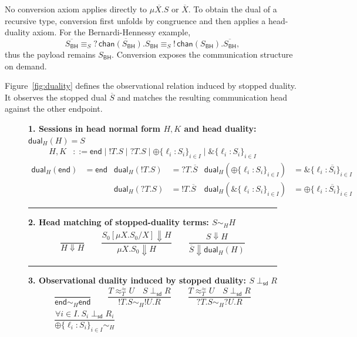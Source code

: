 \documentclass[submission,copyright,creativecommons]{eptcs}
\newcommand{\End}{\mathsf{end}}
\newcommand{\SBH}{S_{\mathsf{BH}}}
\newcommand{\SuspDual}[1]{\overline{#1}}
\newcommand{\EqT}[1]{\mathrel{\approx_T^{#1}}}
\newcommand{\ConvS}{\mathrel{\equiv_S}}
\newcommand{\MatchH}{\mathrel{\sim_H}}
\newcommand{\Obs}{\mathrel{\Downarrow}}
\newcommand{\StopDual}{\mathrel{\perp_{\mathsf{sd}}}}
\newcommand{\HDual}{\mathsf{dual}_H}
\begin{document}
No conversion axiom applies directly to $\SuspDual{\mu X.S}$ or $\SuspDual{X}$.
To obtain the dual of a recursive type, conversion first unfolds by
congruence and then applies a head-duality axiom.  For the
Bernardi-Hennessy example,
\[
\SuspDual{\SBH}
  \ConvS
\SuspDual{?\,\mathsf{chan}(\SBH).\SBH}
  \ConvS
!\,\mathsf{chan}(\SBH).\SuspDual{\SBH},
\]
thus the payload remains $\SBH$. Conversion exposes the
communication structure on demand.

Figure~\ref{fig:duality} defines the observational relation induced by
stopped duality.  It observes the stopped dual $\SuspDual{S}$ and matches the
resulting communication head against the other endpoint.

\begin{figure}[tp]
\footnotesize
\setlength{\arraycolsep}{0.7ex}
\noindent\textbf{1. Sessions in head normal form $H, K$ and head duality: $\HDual(H)=S$}
\begin{align*}
H,K &::= \End \mid !T.S \mid ?T.S
      \mid \oplus\{\ell_i:S_i\}_{i \in I}
      \mid \&\{\ell_i:S_i\}_{i \in I}
\end{align*}
\begin{align*}
\HDual(\End) &= \End &
\HDual(!T.S) &= ?T.\SuspDual{S} &
\HDual(\oplus\{\ell_i:S_i\}_{i \in I}) &=
  \&\{\ell_i:\SuspDual{S_i}\}_{i \in I} \\
&&
\HDual(?T.S) &= !T.\SuspDual{S} &
\HDual(\&\{\ell_i:S_i\}_{i \in I}) &=
  \oplus\{\ell_i:\SuspDual{S_i}\}_{i \in I}
\end{align*}
\vspace{-0.5ex}\hrule\vspace{1ex}
\noindent\textbf{2. Head matching of stopped-duality terms: $S \MatchH H$}
\[
\begin{array}{c}
\dfrac{}{H \Obs H}
\qquad
\dfrac{S_0[\mu X.S_0/X] \Obs H}
      {\mu X.S_0 \Obs H}
\qquad
\dfrac{S \Obs H}
      {\SuspDual{S} \Obs \HDual(H)}
\end{array}
\]
\vspace{-0.5ex}\hrule\vspace{1ex}
\noindent\textbf{3. Observational duality induced by stopped duality: $S
  \StopDual R$}
\[
\begin{array}{c}
\dfrac{}{\End \MatchH \End}
\qquad
\dfrac{T \EqT{\approx} U \quad S \StopDual R}
      {!T.S \MatchH !U.R}
\qquad
\dfrac{T \EqT{\approx} U \quad S \StopDual R}
      {?T.S \MatchH ?U.R}
\\[3ex]
\dfrac{\forall i \in I.\ S_i \StopDual R_i}
      {\oplus\{\ell_i:S_i\}_{i \in I} \MatchH
}
\end{array}\]
\end{figure}
\end{document}
